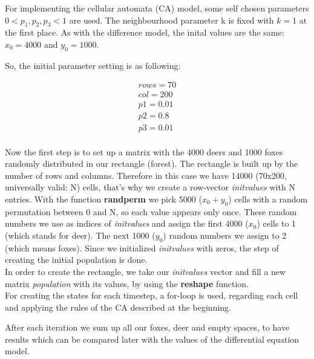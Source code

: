 \documentclass[a4paper,12pt]{article}
\begin{document}
For implementing the cellular automata (CA) model, some self chosen
parameters $0 < p_1, p_2, p_3 < 1$ are used. The neighbourhood parameter k is fixed with $k= 1$ at the first place. 
As with the difference model, the inital values are the same: $x_0=4000$ and $y_0=1000$.

So, the initial parameter setting is as following:

\begin{center}
\begin{displaymath}
\begin{split}
rows = 70\\
col = 200\\
p1= 0.01\\ %
p2= 0.8\\ %
p3= 0.01\\ %
\end{split}
\end{displaymath}
\end{center}

Now the first step is to set up a matrix with the 4000 deers and 1000 foxes randomly distributed in our rectangle (forest). The rectangle is built up by the number of rows and columns. Therefore in this case we have 14000 (70x200, universally valid: N) cells, that's why we create a row-vector \textit{initvalues} with N entries. With the function \textbf{randperm} we pick 5000 ($x_0+y_0$) cells with a random permutation between 0 and N, so each value appears only once. These random numbers we use as indices of \textit{initvalues} and assign the first 4000 ($x_0$) cells to 1 (which stands for deer). The next 1000 ($y_0$) random numbers we assign to 2 (which means foxes). Since we initialized \textit{initvalues} with zeros, the step of creating the initial population is done.\\
In order to create the rectangle, we take our \textit{initvalues} vector and fill a new matrix \textit{population} with its values, by using the \textbf{reshape} function.\\

For creating the states for each timestep, a for-loop is used, regarding each cell and applying the rules of the CA described at the beginning.

After each iteration we sum up all our foxes, deer and empty spaces, to have results which can be compared later with the values of the differential equation model.
\end{document}
